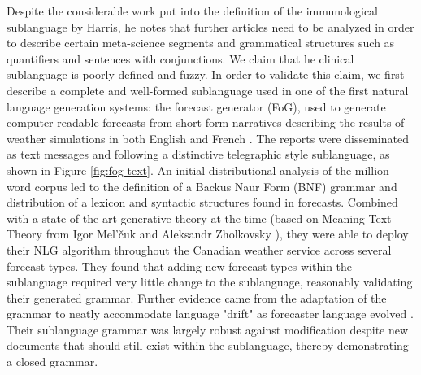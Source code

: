 Despite the considerable work put into the definition of the immunological sublanguage by Harris, he notes that further articles need to be analyzed in order to describe certain meta-science segments and grammatical structures such as quantifiers and sentences with conjunctions. We claim that he clinical sublanguage is poorly defined and fuzzy. In order to validate this claim, we first describe a complete and well-formed sublanguage used in one of the first natural language generation systems: the forecast generator (FoG), used to generate computer-readable forecasts from short-form narratives describing the results of weather simulations in both English and French \citep{goldbergUsingNaturallanguageProcessing1994}. The reports were disseminated as text messages and following a distinctive telegraphic style sublanguage, as shown in Figure \ref{fig:fog-text}. An initial distributional analysis of the million-word corpus led to the definition of a Backus Naur Form (BNF) grammar and distribution of a lexicon and syntactic structures found in forecasts. Combined with a state-of-the-art generative theory at the time (based on Meaning-Text Theory from Igor Mel'čuk and Aleksandr Zholkovsky \citep{ivanovaMeaningTextTheory2022}), they were able to deploy their NLG algorithm throughout the Canadian weather service across several forecast types. They found that adding new forecast types within the sublanguage required very little change to the sublanguage, reasonably validating their generated grammar. Further evidence came from the adaptation of the grammar to neatly accommodate language "drift" as forecaster language evolved \citep{kittredgeSublanguageEngineeringFoG1994}. Their sublanguage grammar was largely robust against modification despite new documents that should still exist within the sublanguage, thereby demonstrating a closed grammar.

